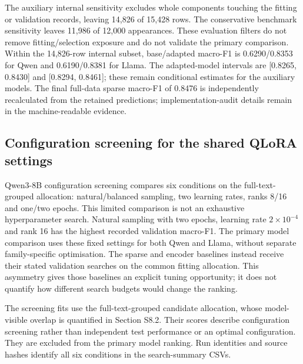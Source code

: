 \documentclass[10pt,a4paper]{article}
\begin{document}
The auxiliary internal sensitivity excludes whole components touching the fitting or validation records, leaving 14,826 of 15,428 rows. The conservative benchmark sensitivity leaves 11,986 of 12,000 appearances. These evaluation filters do not remove fitting/selection exposure and do not validate the primary comparison. Within the 14,826-row internal subset, base/adapted macro-F1 is 0.6290/0.8353 for Qwen and 0.6190/0.8381 for Llama. The adapted-model intervals are [0.8265, 0.8430] and [0.8294, 0.8461]; these remain conditional estimates for the auxiliary models. The final full-data sparse macro-F1 of 0.8476 is independently recalculated from the retained predictions; implementation-audit details remain in the machine-readable evidence.


\subsection{Configuration screening for the shared QLoRA settings}
Qwen3-8B configuration screening compares six conditions on the full-text-grouped allocation: natural/balanced sampling, two learning rates, ranks 8/16 and one/two epochs. This limited comparison is not an exhaustive hyperparameter search. Natural sampling with two epochs, learning rate $2\times10^{-4}$ and rank 16 has the highest recorded validation macro-F1. The primary model comparison uses these fixed settings for both Qwen and Llama, without separate family-specific optimisation. The sparse and encoder baselines instead receive their stated validation searches on the common fitting allocation. This asymmetry gives those baselines an explicit tuning opportunity; it does not quantify how different search budgets would change the ranking.

The screening fits use the full-text-grouped candidate allocation, whose model-visible overlap is quantified in Section S8.2. Their scores describe configuration screening rather than independent test performance or an optimal configuration. They are excluded from the primary model ranking. Run identities and source hashes identify all six conditions in the search-summary CSVs.
\end{document}
